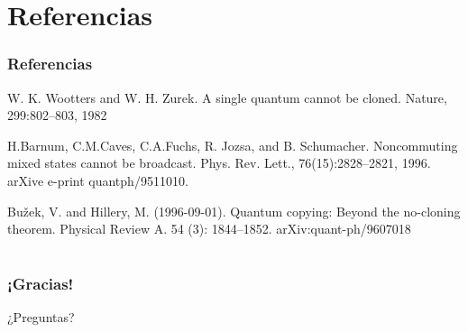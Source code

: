 \documentclass[12pt]{beamer}
\begin{document}
\section{Referencias}
\begin{frame}
    \frametitle{Referencias}
    \begin{thebibliography}{9}
        W. K. Wootters and W. H. Zurek. A single quantum cannot be cloned.
        Nature, 299:802–803, 1982

        H.Barnum, C.M.Caves, C.A.Fuchs, R. Jozsa, and B. Schumacher. Noncommuting mixed states cannot be broadcast. Phys. Rev. Lett.,  76(15):2828–2821, 1996. arXive e-print quantph/9511010.

        Bužek, V. and Hillery, M. (1996-09-01). Quantum copying: Beyond the no-cloning theorem. Physical Review A. 54 (3): 1844–1852. arXiv:quant-ph/9607018
    \end{thebibliography}

\end{frame}

\section{}
\begin{frame}
    \frametitle{¡Gracias!}
    \center ¿Preguntas?
\end{frame}
\end{document}
